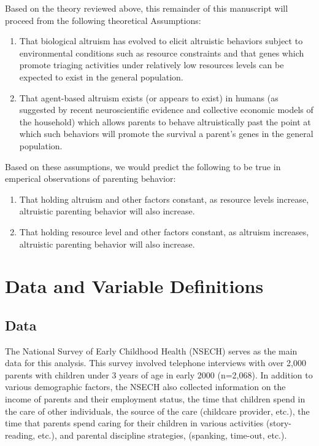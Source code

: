 Based on the theory reviewed above, this remainder of this manuscript will proceed from the following theoretical Assumptions:

\begin{enumerate}
\def\labelenumi{\arabic{enumi}.}
\itemsep1pt\parskip0pt
\item
That biological altruism has evolved to elicit altruistic behaviors subject to environmental conditions such as resource constraints and that genes which promote triaging activities under relatively low resources levels can be expected to exist in the general population. 
\item
That agent-based altruism exists (or appears to exist) in humans (as suggested by recent neuroscientific evidence and collective economic models of the household) which allows parents to behave altruistically past the point at which such behaviors will promote the survival a parent's genes in the general population. 
\end{enumerate}

Based on these assumptions, we would predict the following to be true in emperical observations of parenting behavior: 

\begin{enumerate}
\def\labelenumi{\arabic{enumi}.}
\itemsep1pt\parskip0pt
\item
That holding altruism and other factors constant, as resource levels increase, altruistic parenting behavior will also increase.
\item
That holding resource level and other factors constant, as altruism increases, altruistic parenting behavior will also increase.
\end{enumerate}

\section{Data and Variable Definitions}

\subsection{Data}

The National Survey of Early Childhood Health (NSECH) serves as the main
data for this analysis. This survey involved telephone interviews with
over 2,000 parents with children under 3 years of age in early 2000
(n=2,068). In addition to various demographic factors, the NSECH also
collected information on the income of parents and their employment
status, the time that children spend in the care of other individuals,
the source of the care (childcare provider, etc.), the time that parents
spend caring for their children in various activities (story-reading,
etc.), and parental discipline strategies, (spanking, time-out, etc.).

